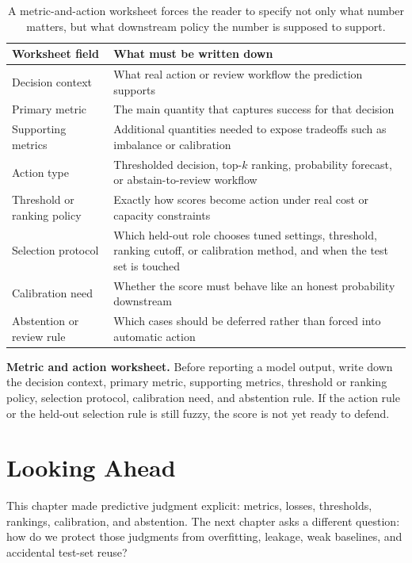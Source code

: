 \begin{table}[t]
\centering
\small
\setlength{\tabcolsep}{4pt}
\begin{tabular}{p{3.2cm}p{7.03cm}}
\toprule
Worksheet field & What must be written down \\
\midrule
Decision context & What real action or review workflow the prediction supports \\
Primary metric & The main quantity that captures success for that decision \\
Supporting metrics & Additional quantities needed to expose tradeoffs such as imbalance or calibration \\
Action type & Thresholded decision, top-$k$ ranking, probability forecast, or abstain-to-review workflow \\
Threshold or ranking policy & Exactly how scores become action under real cost or capacity constraints \\
Selection protocol & Which held-out role chooses tuned settings, threshold, ranking cutoff, or calibration method, and when the test set is touched \\
Calibration need & Whether the score must behave like an honest probability downstream \\
Abstention or review rule & Which cases should be deferred rather than forced into automatic action \\
\bottomrule
\end{tabular}
\caption{A metric-and-action worksheet forces the reader to specify not only what number matters, but what downstream policy the number is supposed to support.}
\label{tab:metric-action-worksheet}
\end{table}

\begin{thinkingtool}
\textbf{Metric and action worksheet.} Before reporting a model output, write down the decision context, primary metric, supporting metrics, threshold or ranking policy, selection protocol, calibration need, and abstention rule. If the action rule or the held-out selection rule is still fuzzy, the score is not yet ready to defend.
\end{thinkingtool}

\section{Looking Ahead}

This chapter made predictive judgment explicit: metrics, losses, thresholds, rankings, calibration, and abstention. The next chapter asks a different question: how do we protect those judgments from overfitting, leakage, weak baselines, and accidental test-set reuse?

